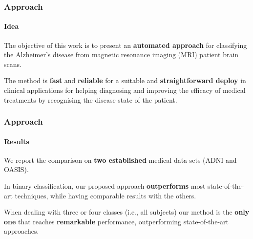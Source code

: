 \begin{frame}
	\frametitle{Approach}
	\framesubtitle{Idea}
	
	\Large
	
	\vspace{0.1cm}
	
	The objective of this work is to present an \textbf{automated approach} for classifying the
	Alzheimer's disease from magnetic resonance imaging (MRI) patient brain scans.
	
	\vspace{0.5cm}
	
	The method is \textbf{fast} and \textbf{reliable} for a suitable and \textbf{straightforward
	deploy} in clinical applications for helping diagnosing and improving the efficacy of medical
	treatments by recognising the disease state of the patient.
\end{frame}

\begin{frame}
	\frametitle{Approach}
	\framesubtitle{Results}
	
	\Large
	
	\vspace{0.2cm}
	
	We report the comparison on \textbf{two established} medical data sets (ADNI and OASIS).
	
	\vspace{0.5cm}
	
	In binary classification, our proposed approach \textbf{outperforms} most state-of-the-art
	techniques, while having comparable results with the others.
	
	\vspace{0.5cm}
	
	When dealing with three or four classes (i.e., all subjects) our method is the \textbf{only one}
	that reaches \textbf{remarkable} performance, outperforming state-of-the-art approaches.
\end{frame}
